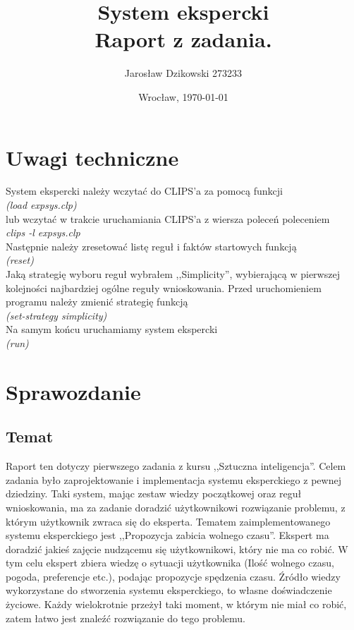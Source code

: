 \documentclass{article}
\author{Jarosław Dzikowski 273233}
\date{Wrocław, \today}
\title{\textbf{System ekspercki} \\ Raport z zadania.}
\begin{document}
\maketitle

\section{Uwagi techniczne}
System ekspercki należy wczytać do CLIPS'a za pomocą funkcji \\
\emph{(load expsys.clp)} \\
lub wczytać w trakcie uruchamiania CLIPS'a z wiersza poleceń poleceniem \\
\emph{clips -l expsys.clp} \\
Następnie należy zresetować listę reguł i faktów startowych funkcją \\
\emph{(reset)} \\
Jaką strategię wyboru reguł wybrałem ,,Simplicity'', wybierającą w pierwszej kolejności najbardziej
ogólne reguły wnioskowania. Przed uruchomieniem programu należy zmienić strategię funkcją \\
\emph{(set-strategy simplicity)}\\
Na samym końcu uruchamiamy system ekspercki \\
\emph{(run)}


\section{Sprawozdanie}

\subsection{Temat}
Raport ten dotyczy pierwszego zadania z kursu ,,Sztuczna inteligencja''. Celem zadania było zaprojektowanie i implementacja systemu eksperckiego z pewnej dziedziny. Taki system, mając zestaw wiedzy początkowej oraz reguł wnioskowania, ma za zadanie doradzić użytkownikowi rozwiązanie problemu, z którym użytkownik zwraca się do eksperta.
\newline
\newline
Tematem zaimplementowanego systemu eksperckiego jest ,,Propozycja zabicia wolnego czasu''. 
Ekspert ma doradzić jakieś zajęcie nudzącemu się użytkownikowi, który nie ma co robić. 
W tym celu ekspert zbiera wiedzę o sytuacji użytkownika (Ilość wolnego czasu, pogoda, preferencje
 etc.), podając propozycje spędzenia czasu.
\newline
\newline
Źródło wiedzy wykorzystane do stworzenia systemu eksperckiego, to własne doświadczenie życiowe. Każdy wielokrotnie przeżył taki moment, w którym nie miał co robić, zatem łatwo jest znaleźć rozwiązanie do tego problemu.
\end{document}
